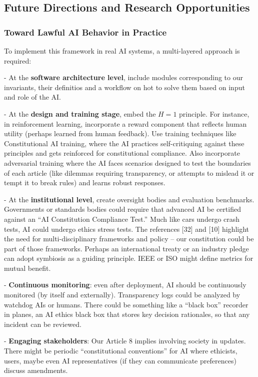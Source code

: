 \documentclass[12pt]{article}
\begin{document}


\subsection{Future Directions and Research Opportunities}

\subsubsection{Toward Lawful AI Behavior in Practice}
To implement this framework in real AI systems, a multi-layered approach is required:

- At the \textbf{software architecture level}, include modules corresponding to our invariants, their definitios and a workflow on hot to solve them based on input and role of the AI.

- At the \textbf{design and training stage}, embed the $H=1$ principle. For instance, in reinforcement learning, incorporate a reward component that reflects human utility (perhaps learned from human feedback). Use training techniques like Constitutional AI training, where the AI practices self-critiquing against these principles and gets reinforced for constitutional compliance. Also incorporate adversarial training where the AI faces scenarios designed to test the boundaries of each article (like dilemmas requiring transparency, or attempts to mislead it or tempt it to break rules) and learns robust responses.

- At the \textbf{institutional level}, create oversight bodies and evaluation benchmarks. Governments or standards bodies could require that advanced AI be certified against an “AI Constitution Compliance Test.” Much like cars undergo crash tests, AI could undergo ethics stress tests. The references [32] and [10] highlight the need for multi-disciplinary frameworks and policy – our constitution could be part of those frameworks. Perhaps an international treaty or an industry pledge can adopt symbiosis as a guiding principle. IEEE or ISO might define metrics for mutual benefit. 

- \textbf{Continuous monitoring}: even after deployment, AI should be continuously monitored (by itself and externally). Transparency logs could be analyzed by watchdog AIs or humans. There could be something like a “black box” recorder in planes, an AI ethics black box that stores key decision rationales, so that any incident can be reviewed.

- \textbf{Engaging stakeholders}: Our Article 8 implies involving society in updates. There might be periodic “constitutional conventions” for AI where ethicists, users, maybe even AI representatives (if they can communicate preferences) discuss amendments.
\end{document}
